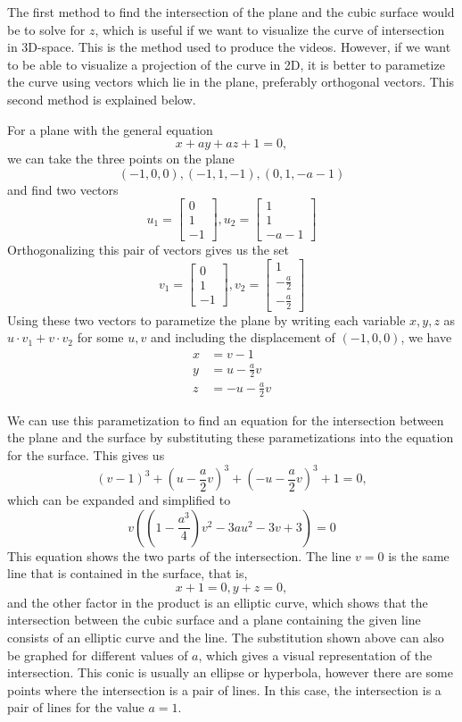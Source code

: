 \documentclass{article}
\begin{document}
	The first method to find the intersection of the plane and the cubic surface would be to solve for $z$, which is useful if we want to visualize the curve of intersection in 3D-space. This is the method used to produce the videos. However, if we want to be able to visualize a projection of the curve in 2D, it is better to parametize the curve using vectors which lie in the plane, preferably orthogonal vectors. This second method is explained below.
	
	For a plane with the general equation 
	\[ x + ay + az + 1 = 0, \]
	we can take the three points on the plane
	\[ (-1, 0, 0), (-1, 1, -1), (0, 1, -a-1) \]
	and find two vectors 
	\[ u_1 = \begin{bmatrix} 0 \\ 1 \\ -1 \end{bmatrix}, u_2 = \begin{bmatrix} 1 \\ 1 \\ -a-1 \end{bmatrix} \]
	Orthogonalizing this pair of vectors gives us the set 
	\[ v_1 = \begin{bmatrix} 0 \\ 1 \\ -1 \end{bmatrix}, v_2 = \begin{bmatrix} 1 \\  - \frac{a}{2} \\ -\frac{a}{2} \end{bmatrix} \]
	Using these two vectors to parametize the plane by writing each variable $x,y,z$ as $u\cdot v_1 + v\cdot v_2$ for some $u, v$ and including the displacement of $(-1, 0, 0)$, we have 
	\begin{align*}
	x &= v - 1\\
	y &= u - \frac{a}{2} v\\
	z &= -u - \frac{a}{2} v \end{align*}
	
	We can use this parametization to find an equation for the intersection between the plane and the surface by substituting these parametizations into the equation for the surface. This gives us
	\[ \left(v-1 \right)^3 + \left(u - \frac{a}{2}v \right)^3 + \left(-u - \frac{a}{2} v \right)^3 + 1 = 0, \]
	which can be expanded and simplified to 
	\[ v\left( \left(1-\frac{a^3}{4} \right)v^2 - 3au^2 - 3v + 3 \right) = 0 \]
	This equation shows the two parts of the intersection. The line $v = 0$ is the same line that is contained in the surface, that is, 
	\[ x + 1 = 0, y + z = 0, \]
	and the other factor in the product is an elliptic curve, which shows that the intersection between the cubic surface and a plane containing the given line consists of an elliptic curve and the line. The substitution shown above can also be graphed for different values of $a$, which gives a visual representation of the intersection. This conic is usually an ellipse or hyperbola, however there are some points where the intersection is a pair of lines. In this case, the intersection is a pair of lines for the value $a = 1$. 
	
\end{document}
